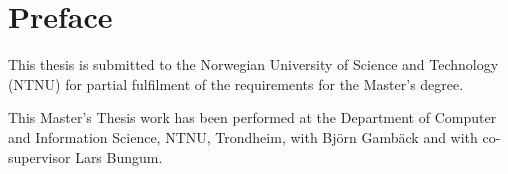 \section*{Preface}

This thesis is submitted to the Norwegian University of Science and Technology (NTNU) for partial fulfilment of the requirements for the Master's degree.

This Master's Thesis work has been performed at the Department of Computer and Information Science, NTNU, Trondheim, with Bj\"{o}rn Gamb\"{a}ck and with co-supervisor Lars Bungum.



\cleardoublepage